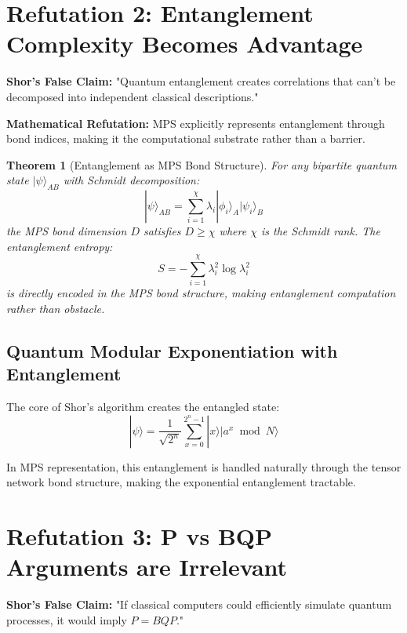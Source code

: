 \documentclass[12pt]{article}
\newtheorem{theorem}{Theorem}[section]
\begin{document}
\section{Refutation 2: Entanglement Complexity Becomes Advantage}

\textbf{Shor's False Claim:} "Quantum entanglement creates correlations that can't be decomposed into independent classical descriptions."

\textbf{Mathematical Refutation:} MPS explicitly represents entanglement through bond indices, making it the computational substrate rather than a barrier.

\begin{theorem}[Entanglement as MPS Bond Structure]
For any bipartite quantum state $|\psi\rangle_{AB}$ with Schmidt decomposition:
\begin{equation}
|\psi\rangle_{AB} = \sum_{i=1}^{\chi} \lambda_i |\phi_i\rangle_A |\psi_i\rangle_B
\end{equation}
the MPS bond dimension $D$ satisfies $D \geq \chi$ where $\chi$ is the Schmidt rank. The entanglement entropy:
\begin{equation}
S = -\sum_{i=1}^{\chi} \lambda_i^2 \log \lambda_i^2
\end{equation}
is directly encoded in the MPS bond structure, making entanglement computation rather than obstacle.
\end{theorem}

\subsection{Quantum Modular Exponentiation with Entanglement}

The core of Shor's algorithm creates the entangled state:
\begin{equation}
|\psi\rangle = \frac{1}{\sqrt{2^n}} \sum_{x=0}^{2^n-1} |x\rangle |a^x \bmod N\rangle
\end{equation}

In MPS representation, this entanglement is handled naturally through the tensor network bond structure, making the exponential entanglement tractable.

\section{Refutation 3: P vs BQP Arguments are Irrelevant}

\textbf{Shor's False Claim:} "If classical computers could efficiently simulate quantum processes, it would imply $P = BQP$."
\end{document}
